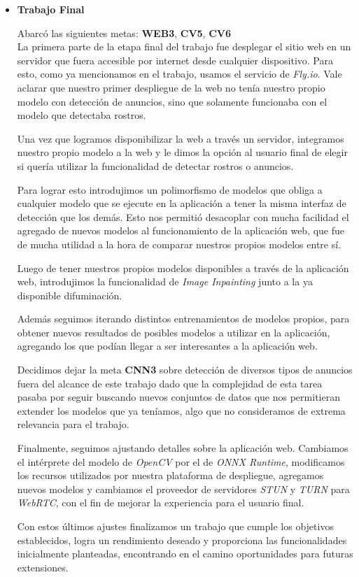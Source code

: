 \documentclass[a4paper]{article}
\begin{document}
\begin{itemize}
\item \textbf{Trabajo Final}

Abarcó las siguientes metas: \textbf{WEB3}, \textbf{CV5}, \textbf{CV6} \\

La primera parte de la etapa final del trabajo fue desplegar el sitio web en un servidor que fuera accesible por internet desde cualquier dispositivo. Para esto, como ya mencionamos en el trabajo, usamos el servicio de \textit{Fly.io}. Vale aclarar que nuestro primer despliegue de la web no tenía nuestro propio modelo con detección de anuncios, sino que solamente funcionaba con el modelo que detectaba rostros.

Una vez que logramos disponibilizar la web a través un servidor, integramos nuestro propio modelo a la web y le dimos la opción al usuario final de elegir si quería utilizar la funcionalidad de detectar rostros o anuncios.

Para lograr esto introdujimos un polimorfismo de modelos que obliga a cualquier modelo que se ejecute en la aplicación a tener la misma interfaz de detección que los demás. Esto nos permitió desacoplar con mucha facilidad el agregado de nuevos modelos al funcionamiento de la aplicación web, que fue de mucha utilidad a la hora de comparar nuestros propios modelos entre sí.

Luego de tener nuestros propios modelos disponibles a través de la aplicación web, introdujimos la funcionalidad de \textit{Image Inpainting} junto a la ya disponible difuminación.

Además seguimos iterando distintos entrenamientos de modelos propios, para obtener nuevos resultados de posibles modelos a utilizar en la aplicación, agregando los que podían llegar a ser interesantes a la aplicación web.

Decidimos dejar la meta \textbf{CNN3} sobre detección de diversos tipos de anuncios fuera del alcance de este trabajo dado que la complejidad de esta tarea pasaba por seguir buscando nuevos conjuntos de datos que nos permitieran extender los modelos que ya teníamos, algo que no consideramos de extrema relevancia para el trabajo.

Finalmente, seguimos ajustando detalles sobre la aplicación web. Cambiamos el intérprete del modelo de \textit{OpenCV} por el de \textit{ONNX Runtime}, modificamos los recursos utilizados por nuestra plataforma de despliegue, agregamos nuevos modelos y cambiamos el proveedor de servidores \textit{STUN} y \textit{TURN} para \textit{WebRTC}, con el fin de mejorar la experiencia para el usuario final.

Con estos últimos ajustes finalizamos un trabajo que cumple los objetivos establecidos, logra un rendimiento deseado y proporciona las funcionalidades inicialmente planteadas, encontrando en el camino oportunidades para futuras extensiones.

\end{itemize}
\end{document}

